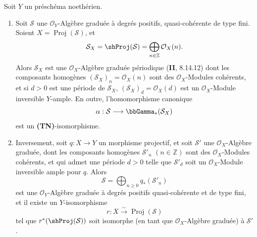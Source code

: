 \begin{proposition}[2.3.4]
\label{III.2.3.4-fr}
Soit $Y$ un préschéma noethérien.
\begin{enumerate}
\item[{\rm(i)}] Soit $\mathcal S$ une $\mathcal O_Y$-Algèbre graduée à
degrés positifs, quasi-cohérente de type fini. Soient
$X=\operatorname{Proj}(\mathcal S)$, et
\[
\mathcal S_X=\shProj(\mathcal S)
=\bigoplus_{n\in\mathbb Z}\mathcal O_X(n).
\]
Alors $\mathcal S_X$ est une $\mathcal O_X$-Algèbre graduée périodique
\textup{(\textbf{II}, 8.14.12)} dont les composants homogènes
$(\mathcal S_X)_n=\mathcal O_X(n)$ sont des $\mathcal O_X$-Modules
cohérents, et si $d>0$ est une période de $\mathcal S_X$,
$(\mathcal S_X)_d=\mathcal O_X(d)$ est un $\mathcal O_X$-Module
inversible $Y$-ample. En outre, l'homomorphisme canonique
\[
\alpha:\mathcal S\longrightarrow\bbGamma_*(\mathcal S_X)
\]
est un \textup{\textbf{(TN)}}-isomorphisme.
\item[{\rm(ii)}] Inversement, soit $q:X\to Y$ un morphisme projectif, et
soit $\mathcal S'$ une $\mathcal O_X$-Algèbre graduée, dont les composants
homogènes $\mathcal S'_n$ $(n\in\mathbb Z)$ sont des
$\mathcal O_X$-Modules cohérents, et qui admet une période $d>0$ telle que
$\mathcal S'_d$ soit un $\mathcal O_X$-Module inversible ample pour $q$.
Alors
\[
\mathcal S=\bigoplus_{n\geq0}q_*(\mathcal S'_n)
\]
est une $\mathcal O_Y$-Algèbre graduée à degrés positifs quasi-cohérente
et de type fini, et il existe un $Y$-isomorphisme
\[
r:X\xrightarrow{\sim}\operatorname{Proj}(\mathcal S)
\]
tel que $r^*(\shProj(\mathcal S))$ soit isomorphe (en tant que
$\mathcal O_X$-Algèbre graduée) à $\mathcal S'$.
\end{enumerate}
\end{proposition}

